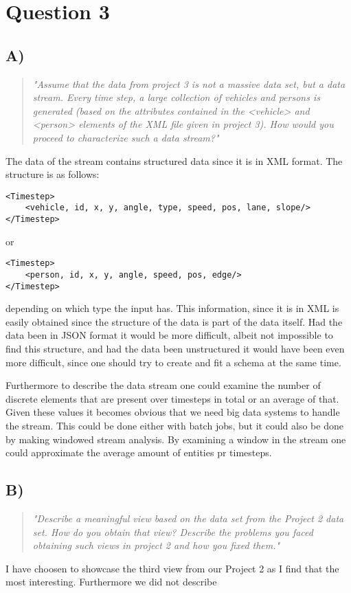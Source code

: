 \section{Question 3}

\subsection{A)}
\begin{quote}
	\textit{"Assume	that	the	data	from	project	3	is	not	a	massive	data	set,	but	a	data	stream.	Every	time	step,	a	large	collection	of	vehicles	and	persons	is	generated	(based	on	the	attributes	contained	in	the	<vehicle>	and	<person>	elements	of	the	XML	file	given	in	project	3).	How	would	you	proceed	to	characterize	such	a	data	stream?"}
\end{quote}
The data of the stream contains structured data since it is in XML format. The structure is as follows:
\begin{verbatim}
<Timestep>
    <vehicle, id, x, y, angle, type, speed, pos, lane, slope/>
</Timestep>
\end{verbatim}
or 
\begin{verbatim}
<Timestep>
    <person, id, x, y, angle, speed, pos, edge/>
</Timestep>
\end{verbatim}
depending on which type the input has. This information, since it is in XML is easily obtained since the structure of the data is part of the data itself. Had the data been in JSON format it would be more difficult, albeit not impossible to find this structure, and had the data been unstructured it would have been even more difficult, since one should try to create and fit a schema at the same time.

Furthermore to describe the data stream one could examine the number of discrete elements that are present over timesteps in total or an average of that. Given these values it becomes obvious that we need big data systems to handle the stream. This could be done either with batch jobs, but it could also be done by making windowed stream analysis. By examining a window in the stream one could approximate the average amount of entities pr timesteps. 

\subsection{B)}
\begin{quote}
		\textit{"Describe	a	meaningful	view	based	on	the	data	set	from	the	Project	2	data	set.	How	do	you	obtain	that	view?	Describe	the	problems	you	faced	obtaining	such	views	in	project	2	and	how	you	fixed	them."}
\end{quote}
I have choosen to showcase the third view from our Project 2 as I find that the most interesting. Furthermore we did not describe 